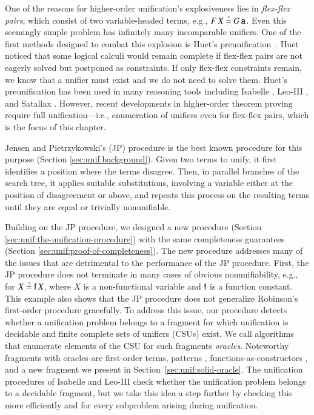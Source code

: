 One of the reasons for higher-order unification's explosiveness lies in
\emph{flex-flex pairs}, which consist of two variable-headed terms,
e.g., $F \, X \unif G \, \cst{a}$. Even this seemingly simple
problem has infinitely many incomparable unifiers.
%
One of the first methods designed to combat this explosion is Huet's
preunification~\cite{gh-75-unification}. Huet noticed that some logical calculi
would remain complete if flex-flex pairs are not eagerly solved but postponed as
constraints. If only flex-flex constraints remain, we know that a unifier must
exist and we do not need to solve them.
%
Huet's preunification has been used in many reasoning tools including Isabelle
\cite{tn-02-isabelle}, Leo-III \cite{sb-21-leo3}, and Satallax
\cite{cb-12-satallax}. However, recent developments in higher-order theorem
proving~\cite{bbtvw-21-sup-lam,br-19-restricted-unif} require full unification---i.e., enumeration of unifiers even for
flex-flex pairs, which is the focus of this chapter.

Jensen and Pietrzykowski's (JP) procedure \cite{jp-76-unif} is the best known
procedure for this purpose (Section \ref{sec:unif:background}). Given two terms to
unify, it first identifies a position where the terms disagree.
Then, in parallel branches of the search tree, it applies suitable substitutions, involving a
variable either at the position of disagreement or above, and repeats this process on
the resulting terms until they are equal or trivially nonunifiable.

Building on the JP procedure, we designed a new procedure (Section
\ref{sec:unif:the-unification-procedure}) with the same completeness guarantees (Section \ref{sec:unif:proof-of-completeness}).
The new procedure addresses many of the issues that are
detrimental to the performance of the JP procedure.
%
First, the JP procedure does not terminate in many cases of obvious
nonunifiability, e.g., for $X \unif \cst{f} \, X$, where $X$ is a non-functional
variable and $\mathsf{f}$ is a function constant. This example also shows that
the JP procedure does not generalize Robinson's first-order procedure gracefully. To address
this issue, our procedure detects whether a unification problem belongs to a
fragment for which unification is decidable and finite complete sets of unifiers (CSUs)
exist.
We call algorithms that enumerate elements of the CSU for such fragments
\emph{oracles}. Noteworthy fragments with oracles are first-order terms,
patterns \cite{tn-93-patterns}, functions-as-constructors
\cite{tl-16-facunif}, and a new fragment 
we present in Section~\ref{sec:unif:solid-oracle}.
%
The unification procedures of Isabelle and Leo-III check whether the unification
problem belongs to a decidable fragment, but we take this idea a step further by
checking this more efficiently and for every subproblem arising during
unification.

